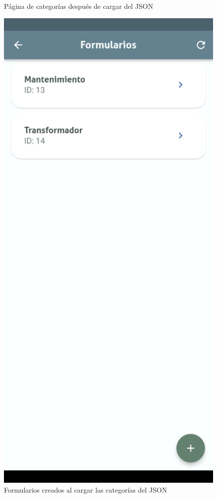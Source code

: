 \documentclass{article}
\begin{document}
\begin{figure}[H]
\begin{minipage}[b]{0.3\textwidth}
    \caption{Página de categorías después de cargar del JSON}
    \label{fig:loadcategories2}
  \end{minipage}
  \hspace{0.02\textwidth}
  \begin{minipage}[b]{0.3\textwidth}
    \centering
    \includegraphics[width=\textwidth]{images/functionality_test/load_categories_3.jpg}
    \caption{Formularios creados al cargar las categorías del JSON}
    \label{fig:loadcategories3}
  \end{minipage}
\end{figure}
\end{document}
